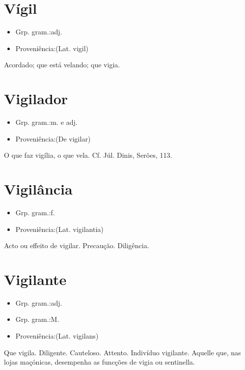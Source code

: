 \documentclass{article}
\begin{document}
\section{Vígil}
\begin{itemize}
\item {Grp. gram.:adj.}
\end{itemize}
\begin{itemize}
\item {Proveniência:(Lat. \textunderscore vigil\textunderscore )}
\end{itemize}
Acordado; que está velando; que vigia.
\section{Vigilador}
\begin{itemize}
\item {Grp. gram.:m.  e  adj.}
\end{itemize}
\begin{itemize}
\item {Proveniência:(De \textunderscore vigilar\textunderscore )}
\end{itemize}
O que faz vigília, o que vela. Cf. Júl. Dinis, \textunderscore Serões\textunderscore , 113.
\section{Vigilância}
\begin{itemize}
\item {Grp. gram.:f.}
\end{itemize}
\begin{itemize}
\item {Proveniência:(Lat. \textunderscore vigilantia\textunderscore )}
\end{itemize}
Acto ou effeito de vigilar.
Precaução.
Diligência.
\section{Vigilante}
\begin{itemize}
\item {Grp. gram.:adj.}
\end{itemize}
\begin{itemize}
\item {Grp. gram.:M.}
\end{itemize}
\begin{itemize}
\item {Proveniência:(Lat. \textunderscore vigilans\textunderscore )}
\end{itemize}
Que vigila.
Diligente.
Cauteloso.
Attento.
Indivíduo vigilante.
Aquelle que, nas lojas maçónicas, desempenha as funcções de vigia ou sentinella.
\end{document}
